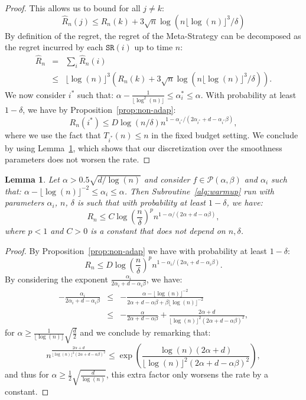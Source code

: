 \documentclass[final,12pt]{colt2018}
\newtheorem{lem}{Lemma}
\newcommand{\floor}[1]{\lfloor #1 \rfloor}
\begin{document}
\begin{proof}
This allows us to bound for all $j \neq k$:
$$
\widehat{R}_n(j) \leq R_n(k) + 3\sqrt{n}\log(n\floor{\log(n)}^3/\delta)
$$
By definition of the regret, the regret of the Meta-Strategy can be decomposed as the regret incurred by each $\texttt{SR}(i)$ up to time $n$:
\begin{eqnarray*}
\widehat{R}_n & = & \sum_i \widehat{R}_n(i)\\
& \leq & \floor{\log(n)}^3 \left(R_n(k) + 3\sqrt{n} \log(n\floor{\log(n)}^3/\delta)\right).
\end{eqnarray*}
We now consider $i^*$ such that: $\alpha - \frac{1}{\floor{\log^2(n)}} \leq \alpha_i^* \leq \alpha$. With probability at least $1-\delta$, we have by Proposition~\ref{prop:non-adap}:
$$
R_n(i^*) \leq D\log(n/\delta) n^{1-\alpha_{i^*}/(2\alpha_{i^*}+d-\alpha_{i^*}\beta)},
$$
where we use the fact that $T_{i^*}(n) \leq n$ in the fixed budget setting. We conclude by using Lemma~\ref{lem:approx_grid}, which shows that our discretization over the smoothness parameters does not worsen the rate.
\end{proof}
\begin{lem}\label{lem:approx_grid}
 Let $\alpha > 0.5\sqrt{d/\log(n)}$ and consider $f \in \mathcal P(\alpha,\beta)$ and $\alpha_i$ such that: $\alpha - \floor{\log(n)}^{-2} \leq \alpha_i \leq \alpha$. Then Subroutine~\ref{alg:warmup} run with parameters $\alpha_i$, $n$, $\delta$ is such that with probability at least $1-\delta$, we have:
$$
R_n \leq C\log\left( \frac{n}{\delta} \right)^p n^{1-\alpha/(2\alpha + d - \alpha\beta)},
$$
where $p < 1$ and $C >0$ is a constant that does not depend on $n,\delta$.
\end{lem}
\begin{proof}
By Proposition~\ref{prop:non-adap} we have with probability at least $1-\delta$:
$$
R_n \leq D\log\left( \frac{n}{\delta} \right)^p n^{1-\alpha_i/(2\alpha_i + d - \alpha_i\beta)}.
$$
By considering the exponent $\frac{\alpha_i}{2\alpha_i + d - \alpha_i\beta}$, we have:
\begin{eqnarray*}
-\frac{\alpha_i}{2\alpha_i + d - \alpha_i\beta} & \leq & -\frac{\alpha - \floor{\log(n)}^{-2}}{2\alpha + d - \alpha\beta + \beta\floor{\log(n)}^{-2}}\\
& \leq & -\frac{\alpha}{2\alpha +d -\alpha\beta} + \frac{2\alpha+d}{\floor{\log(n)}^2(2\alpha +d -\alpha\beta)^2},
\end{eqnarray*}
for $\alpha \geq \frac{1}{\floor{\log(n)}}\sqrt{\frac{d}{2}}$ and we conclude by remarking that:
$$
n^{\frac{2\alpha+d}{\floor{\log(n)}^2(2\alpha +d -\alpha\beta)^2}} \leq \exp\left(\frac{\log(n)(2\alpha+d)}{\floor{\log(n)}^2(2\alpha +d -\alpha\beta)^2}\right),
$$
and thus for $\alpha \geq \frac{1}{2}\sqrt{\frac{d}{\log(n)}}$, this extra factor only worsens the rate by a constant.
\end{proof}
\end{document}
